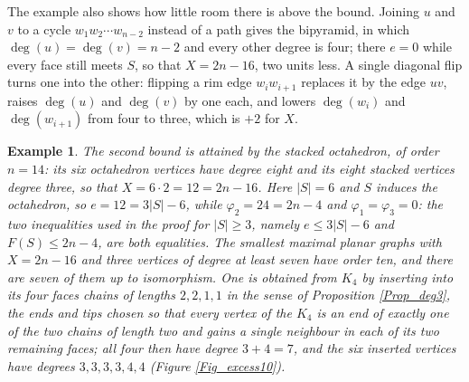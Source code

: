\documentclass[12pt,a4paper]{article}%
\newtheorem{example}[theorem]{Example}
\begin{document}
The example also shows how little room there is above the bound. Joining $u$ and $v$ to a cycle
$w_{1}w_{2}\cdots w_{n-2}$ instead of a path gives the bipyramid, in which $\deg (u)=\deg (v)=n-2$
and every other degree is four; there $e=0$ while every face still meets $S$, so that $X=2n-16$, two
units less.
A single diagonal flip turns one into the other: flipping a rim edge $w_{i}w_{i+1}$ replaces it by
the edge $uv$, raises $\deg (u)$ and $\deg (v)$ by one each, and lowers $\deg (w_{i})$ and
$\deg (w_{i+1})$ from four to three, which is $+2$ for $X$.

\begin{example}
\label{Ex_excess_second}
The second bound is attained by the stacked octahedron, of order $n=14$: its six octahedron vertices
have degree eight and its eight stacked vertices degree three, so that $X=6\cdot 2=12=2n-16$. Here
$|S|=6$ and $S$ induces the octahedron, so $e=12=3|S|-6$, while $\varphi _{2}=24=2n-4$ and
$\varphi _{1}=\varphi _{3}=0$: the two inequalities used in the proof for $|S|\geq 3$, namely
$e\leq 3|S|-6$ and $F(S)\leq 2n-4$, are both equalities.
The smallest maximal planar graphs with $X=2n-16$ and three vertices of degree at least seven have order
ten, and there are seven of them up to isomorphism. One is obtained from $K_{4}$ by inserting into
its four faces chains of lengths $2,2,1,1$ in the sense of Proposition \ref{Prop_deg3}, the ends and
tips chosen so that every vertex of the $K_{4}$ is an end of exactly one of the two chains of length
two and gains a single neighbour in each of its two remaining faces; all four then have degree
$3+4=7$, and the six inserted vertices have degrees $3,3,3,3,4,4$ (Figure \ref{Fig_excess10}).
\end{example}
\end{document}
